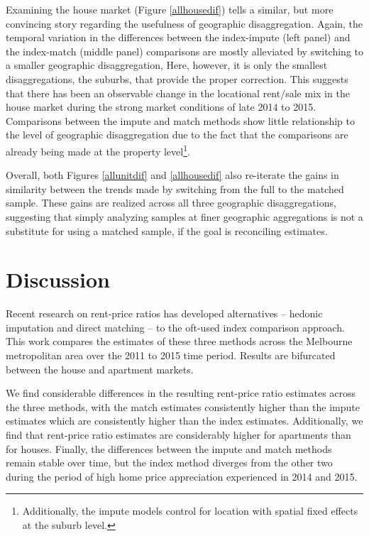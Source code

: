 \documentclass{article}\usepackage[]{graphicx}\usepackage[]{color}
\begin{document}
Examining the house market (Figure \ref{allhousedif}) tells a similar, but more convincing story regarding the usefulness of geographic disaggregation.  Again, the temporal variation in the differences between the index-impute (left panel) and the index-match (middle panel) comparisons are mostly alleviated by switching to a smaller geographic disaggregation,  Here, however, it is only the smallest disaggregations, the suburbs, that provide the proper correction. This suggests that there has been an observable change in the locational rent/sale mix in the house market during the strong market conditions of late 2014 to 2015. Comparisons between the impute and match methods show little relationship to the level of geographic disaggregation due to the fact that the comparisons are already being made at the property level\footnote{Additionally, the impute models control for location with spatial fixed effects at the suburb level.}.\par

Overall, both Figures \ref{allunitdif} and \ref{allhousedif} also re-iterate the gains in similarity between the trends made by switching from the full to the matched sample. These gains are realized across all three geographic disaggregations, suggesting that simply analyzing samples at finer geographic aggregations is not a substitute for using a matched sample, if the goal is reconciling estimates.\par

\section*{Discussion}

Recent research on rent-price ratios has developed alternatives -- hedonic imputation and direct matching -- to the oft-used index comparison approach.  This work compares the estimates of these three methods across the Melbourne metropolitan area over the 2011 to 2015 time period.  Results are bifurcated between the house and apartment markets.\par

We find considerable differences in the resulting rent-price ratio estimates across the three methods, with the match estimates consistently higher than the impute estimates which are consistently higher than the index estimates. Additionally, we find that rent-price ratio estimates are considerably higher for apartments than for houses. Finally, the differences between the impute and match methods remain stable over time, but the index method diverges from the other two during the period of high home price appreciation experienced in 2014 and 2015.\par
\end{document}
